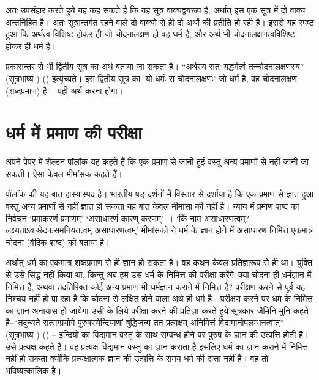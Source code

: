 अतः उपसंहार करते हुये यह कह सकते है कि यह सूत्र वाक्यद्वयरूप है, अर्थात् इस एक सूत्र में दो वाक्य अन्तर्निहित है। अतः सूत्रान्तर्गत रहने वाले दो वाक्यो से ही दो अर्थो की प्रतीति हो रही है। इससे यह स्पष्ट हुआ कि अर्थत्व विशिष्ट होकर ही जो चोदनालक्षण हो वह धर्म है, और अर्थ भी चोदनालक्षणत्वविशिष्ट होकर ही धर्म है।

प्रकारान्तर से भी द्वितीय सूत्र का अर्थ बताया जा सकता है। “अर्थस्य सतः यद्धर्मत्वं तच्चोदनालक्षणस्य” (सूत्रभाष्य ) () इत्युच्यते। इस द्वितीय सूत्र का ‘यो धर्मः स चोदनालक्षणः' जो धर्म है, वह चोदनालक्षण (शब्दप्रमाण) है – यही अर्थ करना होगा।


\section*{धर्म में प्रमाण की परीक्षा}

अपने पेपर  में शेल्डन पॉलॉक यह कहते हैं कि एक प्रमाण से जानी हुई वस्तु अन्य प्रमाणों से नहीं जानी जा सकती। ऐसा केवल मीमांसक कहते है॑।

\begin{myquote}
\end{myquote}

पॉलॉक की यह बात हास्यास्पद है। भारतीय षड् दर्शनों में विस्तार से दर्शाया है कि एक प्रमाण से ज्ञात हुआ वस्तु अन्य प्रमाणों से नहीं ज्ञात हो सकता यह बात केवल मीमांसा की नहीं है। न्याय में प्रमाण शब्द का निर्वचन ‘प्रमाकरणं प्रमाणम्' ‘असाधारणं कारण् करणम्'~। ‘किं नाम असाधारणत्वम्? लक्ष्यताऽवच्छेदकसमनियतत्वम् असाधारणत्वम्' मीमांसको ने धर्म के ज्ञान होने में असाधारण निमित्त एकमात्र चोदना (वैदिक शब्द) को बताया है।

अर्थात् धर्म का एकमात्र शब्दप्रमाण से ही ज्ञान हो सकता है। वह कथन केवल प्रतिज्ञारूप से ही था। युक्ति से उसे सिद्ध नहीं किया था, किन्तु अब हम उस धर्म के निमित्त की परीक्षा करेंगे–क्या चोदना ही धर्मज्ञान में निमित्त है, अथवा तदतिरिक्त कोई अन्य प्रमाण भी धर्मज्ञान कराने में निमित्त है? परीक्षण करने से पूर्व यह निश्चय नहीं हो पा रहा है कि चोदना से लक्षित होने वाला अर्थ ही धर्म है। परीक्षण करने पर धर्म के निमित्त का ज्ञान अनायास हो जायेगा उसी के लिये परीक्षा करने की प्रतिज्ञा करते हुये सूत्रकार जैमिनि मुनि कहते है–“तदुच्यते सत्सम्प्रयोगे पुरुषस्येन्द्रियाणां बुद्धिजन्म तत् प्रत्यक्षम् अनिमित्तं विद्यमानोपलम्भनत्वात्” (सूत्रभाष्य ) () – इन्द्रियों का विद्यमान वस्तु के साथ सम्बन्ध होने पर पुरुष के ज्ञान की उत्पत्ति होती है। उसे प्रत्यक्ष कहते है। वह प्रत्यक्ष विद्यमान वस्तु का ज्ञान कराता है इसलिए धर्म का ज्ञान कराने में निमित्त नहीं हो सकता क्योंकि प्रत्यक्षात्मक ज्ञान की उत्पत्ति के समय धर्म की सत्ता नहीं है। वह तो भविष्यत्कालिक है।

